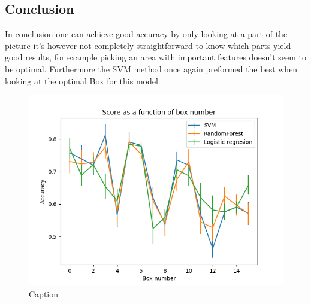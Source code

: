 \documentclass{article}
\begin{document}
\subsection{Conclusion}
In conclusion one can achieve good accuracy by only looking at a part of the picture it's however not completely straightforward to know which parts yield good results, for example picking an area with important features doesn't seem to be optimal. Furthermore the SVM method once again preformed the best when looking at the optimal Box for this model.
\begin{figure}[H]
    \centering
    \includegraphics[scale=0.6]{2b/Result.png}
    \caption{Caption}
    \label{result 2b}
\end{figure}
\end{document}

